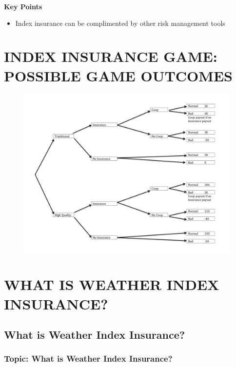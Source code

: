 \documentclass[letterpaper,10pt,english]{sphinxmanual}
\begin{document}
\textbf{Key Points}
\begin{itemize}
\item {} 
Index insurance can be complimented by other risk management tools

\end{itemize}


\chapter{INDEX INSURANCE GAME: POSSIBLE GAME OUTCOMES}
\label{games/gameresults_en_Web:index-insurance-game-possible-game-outcomes}\label{games/gameresults_en_Web::doc}\begin{figure}[htbp]
\centering

\includegraphics{gameresults.png}
\end{figure}


\chapter{WHAT IS WEATHER INDEX INSURANCE?}
\label{index_updated_educationalMat:what-is-weather-index-insurance}

\section{What is Weather Index Insurance?}
\label{whatisindexinsurance/weather/weatherindexinsurance_en::doc}\label{whatisindexinsurance/weather/weatherindexinsurance_en:what-is-weather-index-insurance}

\subsection{Topic: What is Weather Index Insurance?}
\label{whatisindexinsurance/weather/weatherindexinsurance_en:topic-what-is-weather-index-insurance}
\end{document}
